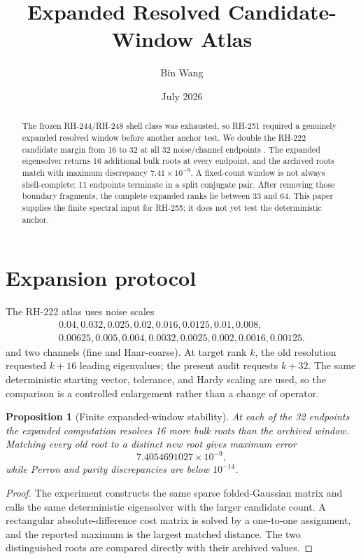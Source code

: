 \documentclass[11pt]{article}
\title{Expanded Resolved Candidate-Window Atlas}
\author{Bin Wang}
\date{July 2026}
\newtheorem{proposition}[theorem]{Proposition}
\theoremstyle{remark}
\begin{document}
\maketitle

\begin{abstract}
The frozen RH-244/RH-248 shell class was exhausted, so RH-251 required a
genuinely expanded resolved window before another anchor test.  We double the
RH-222 candidate margin from 16 to 32 at all 32 noise/channel endpoints
\citep{WangRH222,WangRH248}.  The
expanded eigensolver returns 16 additional bulk roots at every endpoint, and
the archived roots match with maximum discrepancy $7.41\times10^{-9}$.  A
fixed-count window is not always shell-complete: 11 endpoints terminate in a
split conjugate pair.  After removing those boundary fragments, the complete
expanded ranks lie between 33 and 64.  This paper supplies the finite spectral
input for RH-255; it does not yet test the deterministic anchor.
\end{abstract}

\section{Expansion protocol}

The RH-222 atlas uses noise scales \citep{WangRH222}
\[
\begin{gathered}
 0.04,0.032,0.025,0.02,0.016,0.0125,0.01,0.008,\\
 0.00625,0.005,0.004,0.0032,0.0025,0.002,0.0016,0.00125.
\end{gathered}
\]
and two channels (fine and Haar-coarse).  At target rank $k$, the old
resolution requested $k+16$ leading eigenvalues; the present audit requests
$k+32$.  The same deterministic starting vector, tolerance, and Hardy scaling
are used, so the comparison is a controlled enlargement rather than a change
of operator.

\begin{proposition}[Finite expanded-window stability]
\label{prop:window}
At each of the 32 endpoints the expanded computation resolves 16 more bulk
roots than the archived window.  Matching every old root to a distinct new
root gives maximum error
\[
 7.4054691027\times10^{-9},
\]
while Perron and parity discrepancies are below $10^{-14}$.
\end{proposition}

\begin{proof}
The experiment constructs the same sparse folded-Gaussian matrix and calls the
same deterministic eigensolver with the larger candidate count.  A rectangular
absolute-difference cost matrix is solved by a one-to-one assignment, and the
reported maximum is the largest matched distance.  The two distinguished roots
are compared directly with their archived values.
\end{proof}
\end{document}
